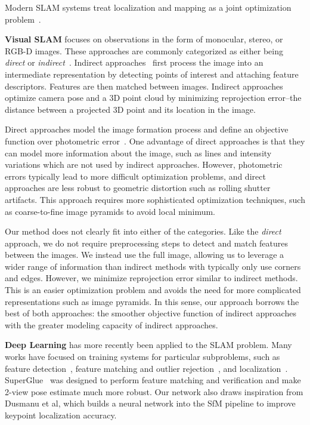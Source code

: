 \documentclass{article}
\begin{document}
Modern SLAM systems treat localization and mapping as a joint optimization problem~\cite{robustperception}.

\noindent \textbf{Visual SLAM} focuses on observations in the form of monocular, stereo, or RGB-D images. These approaches are commonly categorized as either being \emph{direct} or \emph{indirect}~\cite{dso}. Indirect approaches~\cite{orbslam,orbslam2,orbslam3,kimera} first process the image into an intermediate representation by detecting points of interest and attaching feature descriptors. Features are then matched between images. Indirect approaches optimize camera pose and a 3D point cloud by minimizing reprojection error--the distance between a projected 3D point and its location in the image.

Direct approaches model the image formation process and define an objective function over photometric error~\cite{lsd,dso,dsm}. One advantage of direct approaches is that they can model more information about the image, such as lines and intensity variations\cite{dso} which are not used by indirect approaches. However, photometric errors typically lead to more difficult optimization problems, and direct approaches are less robust to geometric distortion such as rolling shutter artifacts. This approach requires more sophisticated optimization techniques, such as coarse-to-fine image pyramids to avoid local minimum.

Our method does not clearly fit into either of the categories. Like the \emph{direct} approach, we do not require preprocessing steps to detect and match features between the images. We instead use the full image, allowing us to leverage a wider range of information than indirect methods with typically only use corners and edges. However, we minimize reprojection error similar to indirect methods. This is an easier optimization problem and avoids the need for more complicated representations such as image pyramids. In this sense, our approach borrows the best of both approaches: the smoother objective function of indirect approaches with the greater modeling capacity of indirect approaches.

\noindent \textbf{Deep Learning} has more recently been applied to the SLAM problem. Many works have focused on training systems for particular subproblems, such as feature detection~\cite{superpoint,ucn,hardnet,geodesc,lfnet}, feature matching and outlier rejection~\cite{superglue,ranftl2018deep}, and localization~\cite{lmreloc,back2thefeature}. SuperGlue~\cite{superglue} was designed to perform feature matching and verification and make 2-view pose estimate much more robust. Our network also draws inspiration from Dusmanu et al\cite{lfg}, which builds a neural network into the SfM pipeline to improve keypoint localization accuracy.
\end{document}
